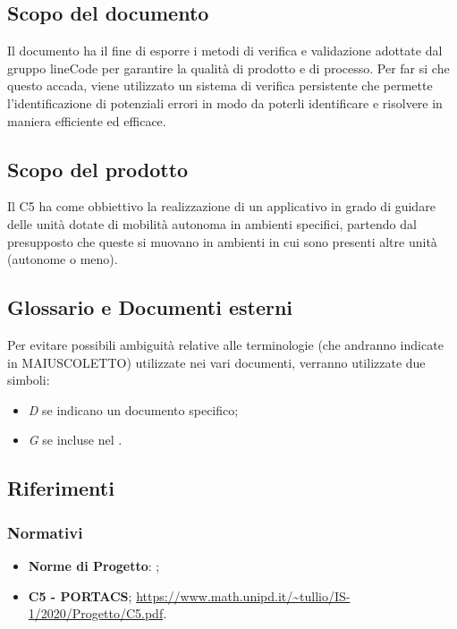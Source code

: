 \subsection{Scopo del documento}
Il documento ha il fine di esporre i metodi di verifica e validazione adottate dal gruppo lineCode per garantire la qualità di prodotto e di processo. Per far si che questo accada, viene utilizzato un sistema di verifica persistente che permette l'identificazione di potenziali errori in modo da poterli identificare e risolvere in maniera efficiente ed efficace.

\subsection{Scopo del prodotto}
Il  C5 ha come obbiettivo la realizzazione di un applicativo  in grado di guidare delle unità dotate di mobilità autonoma in ambienti specifici, partendo dal presupposto che queste si muovano in ambienti in cui sono presenti altre unità (autonome o meno).

\subsection{Glossario e Documenti esterni}
Per evitare possibili ambiguità relative alle terminologie (che andranno indicate in MAIUSCOLETTO) utilizzate	nei vari documenti, verranno utilizzate due simboli:
\begin{itemize}
	\item \textit{D} se indicano un documento specifico;
	\item \textit{G} se incluse nel .
\end{itemize}

\subsection{Riferimenti}

\subsubsection{Normativi}
\begin{itemize}
	\item \textbf{Norme di Progetto}: ;
	\item \textbf{ C5 - PORTACS}; 					\url{https://www.math.unipd.it/~tullio/IS-1/2020/Progetto/C5.pdf}.
\end{itemize}


